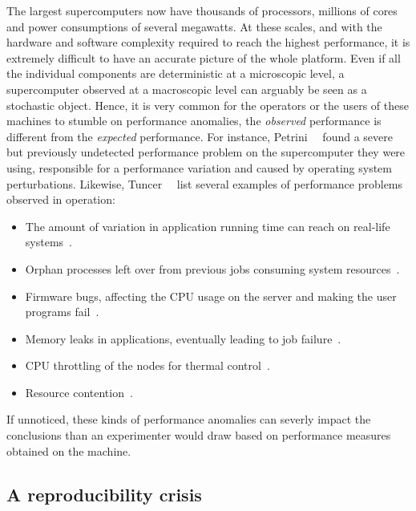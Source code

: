             The largest supercomputers now have thousands of processors, millions of cores and power consumptions of several
            megawatts. At these scales, and with the hardware and software complexity required to reach the highest
            performance, it is extremely difficult to have an accurate picture of the whole platform. Even if all the
            individual components are deterministic at a microscopic level, a supercomputer observed at a macroscopic level
            can arguably be seen as a stochastic object. Hence, it is very common for the operators or the users of these
            machines to stumble on performance anomalies, \ie the \emph{observed} performance is different from the
            \emph{expected} performance. For instance, Petrini~\etal~\cite{Petrini_2003} found a severe but previously
            undetected performance problem on the supercomputer they were using, responsible for a 
            performance variation and caused by operating system perturbations. Likewise,
            Tuncer~\etal~\cite[Section~1]{Tuncer_2017} list several examples of performance problems observed in operation:
            \begin{itemize}
                \item The amount of variation in application running time can reach  on real-life
                    systems~\cite{Bhatele_2013,Skinner}.
                \item Orphan processes left over from previous jobs consuming system resources~\cite{Brandt_2010}.
                \item Firmware bugs, affecting the CPU usage on the server and making the user programs
                    fail~\cite{cisco_bug}.
                \item Memory leaks in applications, eventually leading to job failure~\cite{Agelastos_2015}.
                \item CPU throttling of the nodes for thermal control~\cite{Brandt2015EnablingAO}.
                \item Resource contention~\cite{Bhatele_2013,dorier:hal-00916091}.
            \end{itemize}
            If unnoticed, these kinds of performance anomalies can severly impact the conclusions than an experimenter
            would draw based on performance measures obtained on the machine.

        \subsection{A reproducibility crisis}%
        \label{sub:reproducibility_crisis}

